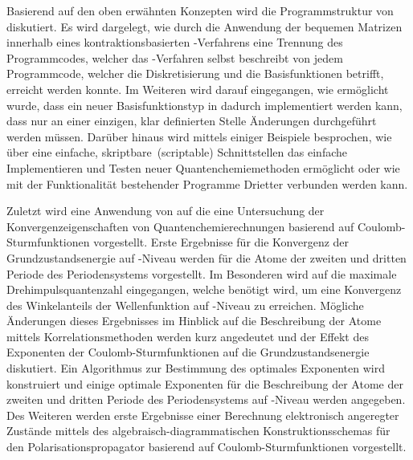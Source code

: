 Basierend auf den oben erwähnten Konzepten wird die Programmstruktur
von \molsturm diskutiert.
Es wird dargelegt, wie durch die Anwendung der bequemen Matrizen
innerhalb eines kontraktionsbasierten \SCF-Verfahrens
eine Trennung des Programmcodes,
welcher das \SCF-Verfahren selbst beschreibt
von jedem Programmcode, welcher die Diskretisierung und die Basisfunktionen betrifft,
erreicht werden konnte.
Im Weiteren wird darauf eingegangen,
wie ermöglicht wurde, dass ein neuer Basisfunktionstyp
in \molsturm dadurch implementiert werden kann,
dass nur an einer einzigen, klar definierten Stelle
Änderungen durchgeführt werden müssen.
Darüber hinaus wird mittels einiger Beispiele besprochen,
wie \molsturm über eine einfache, skriptbare~(scriptable) Schnittstellen
das einfache Implementieren und Testen neuer Quantenchemiemethoden
ermöglicht oder wie \molsturm mit der Funktionalität
bestehender Programme Drietter verbunden werden kann.

Zuletzt wird eine Anwendung von \molsturm auf
die eine Untersuchung der Konvergenzeigenschaften
von Quantenchemierechnungen basierend auf Coulomb-Sturmfunktionen vorgestellt.
Erste Ergebnisse für die Konvergenz der Grundzustandsenergie auf \HF-Niveau
werden für die Atome der zweiten und dritten Periode des Periodensystems vorgestellt.
Im Besonderen wird auf die maximale Drehimpulsquantenzahl eingegangen,
welche benötigt wird,
um eine Konvergenz des Winkelanteils der Wellenfunktion
auf \HF-Niveau zu erreichen.
Mögliche Änderungen dieses Ergebnisses im Hinblick auf die Beschreibung
der Atome mittels Korrelationsmethoden werden kurz angedeutet
und der Effekt des Exponenten der Coulomb-Sturmfunktionen
auf die Grundzustandsenergie diskutiert.
Ein Algorithmus zur Bestimmung des optimales Exponenten wird konstruiert
und einige optimale Exponenten für die Beschreibung der Atome
der zweiten und dritten Periode des Periodensystems
auf \HF-Niveau werden angegeben.
Des Weiteren werden erste Ergebnisse einer Berechnung elektronisch
angeregter Zustände
mittels des algebraisch-diagrammatischen Konstruktionsschemas
für den Polarisationspropagator basierend auf Coulomb-Sturmfunktionen vorgestellt.
